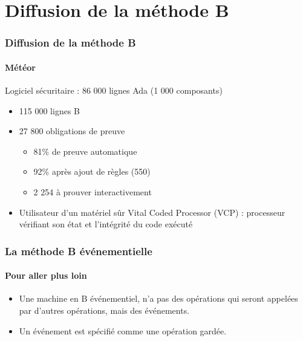 \documentclass[11pt,a4paper,xcolor=table, handout]{beamer} %
\begin{document}
\section{Diffusion de la méthode B}
\begin{frame}
\frametitle{Diffusion de la méthode B}
\framesubtitle{Météor}
Logiciel sécuritaire : 86 000 lignes Ada (1 000
composants)
\begin{itemize}
\item 115 000 lignes B
\item 27 800 obligations de preuve
\begin{itemize}
\item 81\% de preuve automatique
\item 92\% après ajout de règles (550)
\item 2 254 à prouver interactivement
\end{itemize}
\item Utilisateur d'un matériel sûr Vital Coded Processor (VCP) : processeur vérifiant son état et l'intégrité du code exécuté
\end{itemize}
\end{frame}

\begin{frame}
\frametitle{La méthode B événementielle}
\framesubtitle{Pour aller plus loin}
\begin{itemize}
\item Une machine en B  événementiel, n'a pas des opérations qui seront appelées par d'autres opérations, mais des  événements.
\item Un  événement est spécifié comme une opération gardée.
\end{itemize}

\end{frame}
\end{document}
